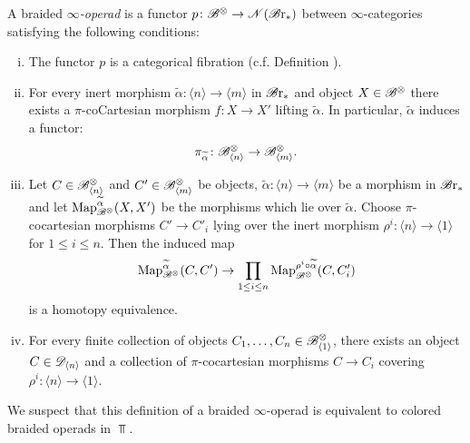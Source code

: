 \begin{defin} 
    A braided $\infty${\em-operad} is a functor $p \colon \mathscr{B}^{\otimes} \to \mathscr{N}(\mathscr{B} \text{r}_{\ast})$
    between $\infty$-categories satisfying the following conditions:
    \begin{enumerate}[(i)]
         \item The functor $p$ is a categorical fibration (c.f. Definition
         \cite[Corollary 2.4.6.5]{hht}).

        \item For every inert morphism $\widetilde{\alpha} \colon \langle n
        \rangle \to \langle m \rangle$ in $\mathscr{B} \text{r}_{\ast}$ and object $X \in \mathscr{B}^{\otimes}$ there
        exists a $\pi$-coCartesian morphism $f \colon X \to X'$ lifting
        $\widetilde{\alpha}$. In particular, $\widetilde{\alpha}$ induces a
        functor: $$\pi_{\widetilde{\alpha}} \colon \mathscr{B}^{\otimes}_{\langle n \rangle} \to
        \mathscr{B}^{\otimes}_{\langle m \rangle}.$$


    \item Let $C \in \mathscr{B}^{\otimes}_{\langle n \rangle}$ and $C' \in \mathscr{B}^{\otimes}_{\langle m
    \rangle}$ be objects, $\widetilde{\alpha}  : \langle n \rangle \to \langle m
    \rangle$ be a morphism in $\mathscr{B} \text{r}_{\ast}$ and let $\operatorname{Map}_{\mathscr{B}^{\otimes}}^{\widetilde{\alpha}}(X,
    X')$ be the morphisms which lie over $\widetilde{\alpha}$. Choose
    $\pi$-cocartesian morphisms $C' \to C'_i$ lying over the inert morphism
    $\rho^i \colon \langle n \rangle \to \langle 1 \rangle$ for $1 \leq i \leq
    n$. Then the induced map
    \[
        \operatorname{Map}_{\mathscr{B}^{\otimes}}^{\widetilde{\alpha}}(C, C') \to \prod_{1 \leq i \leq n} \operatorname{Map}_{\mathscr{B}^{\otimes}}^{\rho^i \circ \widetilde{\alpha}}(C, C_i')
    \]
    is a homotopy equivalence.
    
    \item For every finite collection of objects $C_1, \dots, C_n \in
    \mathscr{B}^{\otimes}_{\langle 1 \rangle}$, there exists an object $C \in \mathscr{D}_{\langle n
    \rangle}$ and a collection of $\pi$-cocartesian morphisms $C \to C_i$
    covering $\rho^i \colon \langle n \rangle \to \langle 1 \rangle$.
    \end{enumerate}
\end{defin}
We suspect that this definition of a braided $\infty$-operad is equivalent to
colored braided operads in $\Top$.
 
